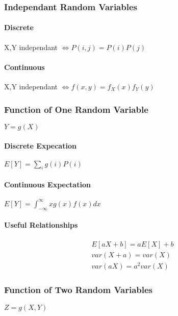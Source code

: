 \subsubsection{Independant Random Variables}
\paragraph{Discrete} X,Y independant $\iff P(i,j) = P(i)P(j)$
\paragraph{Continuous} X,Y independant $\iff f(x,y) = f_X(x) f_Y(y)$
\subsubsection{Function of One Random Variable}
$Y= g(X)$
\paragraph{Discrete Expecation}
$E[Y] = \sum_i g(i)P(i)$
\paragraph{Continuous Expectation}
$E[Y] = \int_{-\infty}^{\infty} x g(x) f(x) dx$
\paragraph{Useful Relationships}
\begin{align*}
	E[aX+b] = aE[X] + b \\
	var(X+a) = var(X) \\
	var(aX) = a^2 var(X)
\end{align*}
\subsubsection{Function of Two Random Variables}
$Z =g(X,Y)$
\paragraph{}
\paragraph{}
\paragraph{}
\paragraph{}
\paragraph{}
\paragraph{}
\paragraph{}
\paragraph{}










